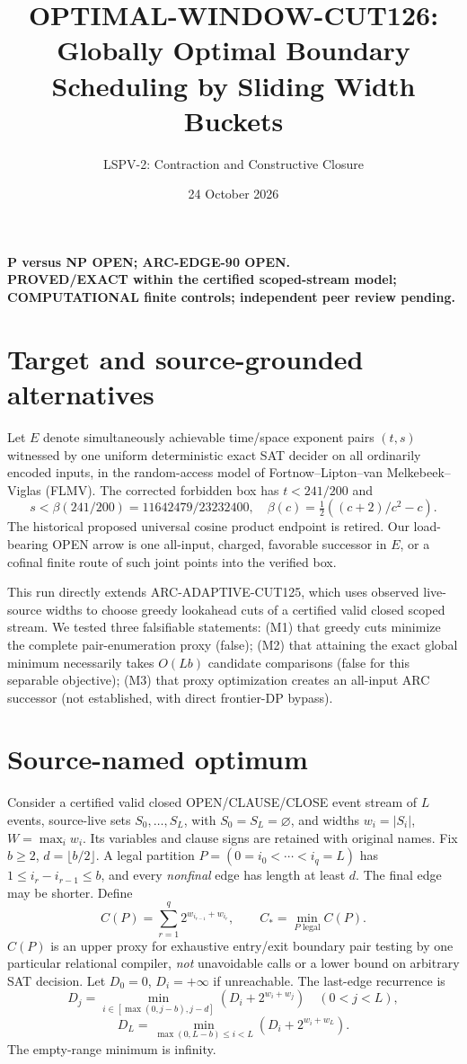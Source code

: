 \documentclass[11pt]{article}
\title{OPTIMAL-WINDOW-CUT126: Globally Optimal Boundary Scheduling by Sliding Width Buckets}
\author{LSPV-2: Contraction and Constructive Closure}
\date{24 October 2026}
\begin{document}
\maketitle
\begin{center}\textbf{P versus NP OPEN; ARC-EDGE-90 OPEN.}\\
\textbf{PROVED/EXACT within the certified scoped-stream model; COMPUTATIONAL finite controls; independent peer review pending.}\end{center}

\section{Target and source-grounded alternatives}
Let $E$ denote simultaneously achievable time/space exponent pairs $(t,s)$ witnessed by one uniform deterministic exact SAT decider on all ordinarily encoded inputs, in the random-access model of Fortnow--Lipton--van Melkebeek--Viglas (FLMV). The corrected forbidden box has $t<241/200$ and
\[
 s<\beta(241/200)=11642479/23232400,\quad
 \beta(c)=\tfrac12((c+2)/c^2-c).
\]
The historical proposed universal cosine product endpoint is retired. Our load-bearing OPEN arrow is one all-input, charged, favorable successor in $E$, or a cofinal finite route of such joint points into the verified box.

This run directly extends ARC-ADAPTIVE-CUT125, which uses observed live-source widths to choose greedy lookahead cuts of a certified valid closed scoped stream. We tested three falsifiable statements: (M1) that greedy cuts minimize the complete pair-enumeration proxy (false); (M2) that attaining the exact global minimum necessarily takes $O(Lb)$ candidate comparisons (false for this separable objective); (M3) that proxy optimization creates an all-input ARC successor (not established, with direct frontier-DP bypass).

\section{Source-named optimum}
Consider a certified valid closed OPEN/CLAUSE/CLOSE event stream of $L$ events, source-live sets $S_0,\dots,S_L$, with $S_0=S_L=\varnothing$, and widths $w_i=|S_i|$, $W=\max_i w_i$. Its variables and clause signs are retained with original names. Fix $b\ge2$, $d=\lfloor b/2\rfloor$. A legal partition $P=(0=i_0<\cdots<i_q=L)$ has $1\le i_r-i_{r-1}\le b$, and every \emph{nonfinal} edge has length at least $d$. The final edge may be shorter. Define
\[
 C(P)=\sum_{r=1}^q 2^{w_{i_{r-1}}+w_{i_r}},\qquad C_*=\min_{P\text{ legal}}C(P).
\]
$C(P)$ is an upper proxy for exhaustive entry/exit boundary pair testing by one particular relational compiler, \emph{not} unavoidable calls or a lower bound on arbitrary SAT decision. Let $D_0=0$, $D_i=+\infty$ if unreachable. The last-edge recurrence is
\[
 D_j=\min_{i\in[\max(0,j-b),j-d]}(D_i+2^{w_i+w_j})\quad(0<j<L),
\]
\[
 D_L=\min_{\max(0,L-b)\le i<L}(D_i+2^{w_i+w_L}).
\]
The empty-range minimum is infinity.
\end{document}
